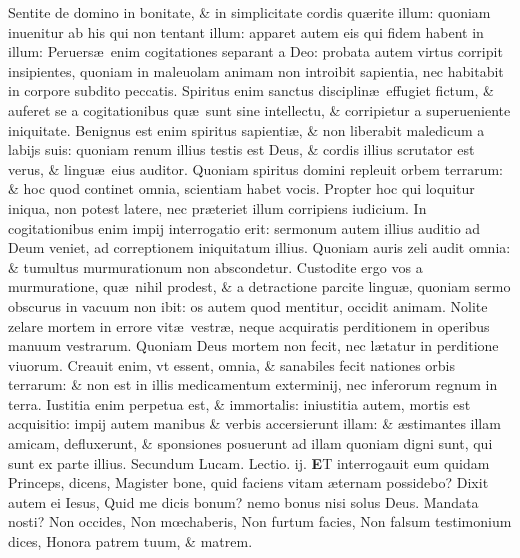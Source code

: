 \documentclass[a5paper,10pt]{book}
\def\leftmarginnote{%
	\lrmarginnote{\hskip -\marginparsep \hskip -6.5em}}
\def\ae{æ}
\def\oe{œ}
\begin{document}
\begin{multicols*}{2}
Sentite de domino in bonitate, \& in simplicitate cordis qu\ae rite illum: quoniam inuenitur ab his qui non tentant illum: apparet autem eis qui fidem habent
in illum: Peruers\ae \ enim cogitationes separant a Deo: probata autem virtus corripit insipientes, quoniam in maleuolam animam non introibit sapientia, nec habitabit in corpore subdito peccatis.
Spiritus enim sanctus disciplin\ae \ effugiet fictum, \& auferet se a cogitationibus qu\ae \ sunt sine intellectu, \& corripietur a superueniente iniquitate.
Benignus est enim spiritus sapienti\ae , \& non liberabit maledicum a labijs suis: quoniam renum illius testis est Deus, \& cordis illius scrutator est verus, \& lingu\ae \ eius auditor.
Quoniam spiritus domini repleuit orbem terrarum: \& hoc quod continet omnia, scientiam habet vocis.
Propter hoc qui loquitur iniqua, non potest latere, nec pr\ae teriet illum corripiens iudicium.
In cogitationibus enim impij interrogatio erit: sermonum autem illius auditio ad Deum veniet, ad correptionem iniquitatum illius.
Quoniam auris zeli audit omnia: \& tumultus murmurationum non abscondetur.
Custodite ergo vos a murmuratione, qu\ae \ nihil prodest, \& a detractione parcite lingu\ae , quoniam sermo obscurus in vacuum non ibit: os autem quod mentitur, occidit animam.
Nolite zelare mortem in errore vit\ae \ vestr\ae , neque acquiratis perditionem in operibus manuum vestrarum.
Quoniam Deus mortem non fecit, nec l\ae tatur in perditione viuorum. Creauit enim, vt essent, omnia, \& sanabiles fecit nationes orbis terrarum: \& non est in illis medicamentum exterminij, nec inferorum regnum in terra.
Iustitia enim perpetua est, \& immortalis: iniustitia autem, mortis est acquisitio: impij autem manibus \& verbis accersierunt illam: \& \ae stimantes illam amicam, defluxerunt, \& sponsiones posuerunt ad illam quoniam digni sunt, qui sunt ex parte illius.
\newline \color{red} Secundum Lucam. \hfill Lectio. ij. \color{black}
\vspace{-.25em}
\lettrine[lines=2]{\bfseries \color{red} E}{}T\leftmarginnote{\begin{flushright}c. 18.\\D\end{flushright}} interrogauit eum quidam Princeps, dicens, Magister bone, quid faciens vitam \ae ternam possidebo?
Dixit autem ei Iesus, Quid me dicis bonum? nemo bonus nisi solus Deus. Mandata nosti? Non occides, Non m\oe chaberis, Non furtum facies, Non falsum testimonium dices, Honora patrem tuum, \& matrem.

\end{multicols*}
\end{document}
